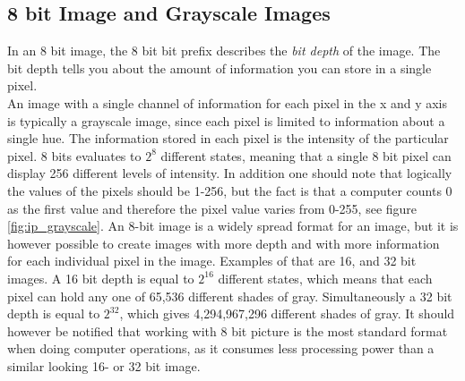 \subsection{8 bit Image and Grayscale Images}
In an 8 bit image, the 8 bit bit prefix describes the \textit{bit depth} of the image. The bit depth tells you about the amount of information you can store in a single pixel.
\\
An image with a single channel of information for each pixel in the x and y axis is typically a grayscale image, since each pixel is limited to information about a single hue. The information stored in each pixel is the intensity of the particular pixel. 8 bits evaluates to $2^8$ different states, meaning that a single 8 bit pixel can display 256 different levels of intensity. In addition one should note that logically the values of the pixels should be 1-256, but the fact is that a computer counts 0 as the first value and therefore the pixel value varies from 0-255, see figure \eqref{fig:ip_grayscale}. An 8-bit image is a widely spread format for an image, but it is however possible to create images with more depth and with more information for each individual pixel in the image. Examples of that are 16, and 32 bit images. A 16 bit depth is equal to $2^{16}$ different states, which means that each pixel can hold any one of 65,536 different shades of gray. Simultaneously a 32 bit depth is equal to $2^{32}$, which gives 4,294,967,296 different shades of gray. It should however be notified that working with 8 bit picture is the most standard format when doing computer operations, as it consumes less processing power than a similar looking 16- or 32 bit image.
\\
\\
